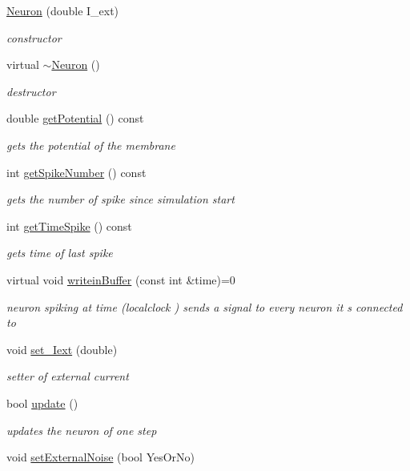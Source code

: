 \begin{DoxyCompactItemize}
\item 
\hyperlink{classNeuron_ab5d525bfb8a3ad0442c3e2980b5a144a}{Neuron} (double I\-\_\-ext)
\begin{DoxyCompactList}\small\item\em constructor \end{DoxyCompactList}\item 
\hypertarget{classNeuron_a94a250ce7e167760e593979b899745b1}{virtual \hyperlink{classNeuron_a94a250ce7e167760e593979b899745b1}{$\sim$\-Neuron} ()}\label{classNeuron_a94a250ce7e167760e593979b899745b1}

\begin{DoxyCompactList}\small\item\em destructor \end{DoxyCompactList}\item 
double \hyperlink{classNeuron_ae2bc004a58621da0d1c51591400ca87d}{get\-Potential} () const 
\begin{DoxyCompactList}\small\item\em gets the potential of the membrane \end{DoxyCompactList}\item 
int \hyperlink{classNeuron_af4482bf7c03f6ac6d6a510fd9c022073}{get\-Spike\-Number} () const 
\begin{DoxyCompactList}\small\item\em gets the number of spike since simulation start \end{DoxyCompactList}\item 
int \hyperlink{classNeuron_ac800b0047abe17000848648ed81e1017}{get\-Time\-Spike} () const 
\begin{DoxyCompactList}\small\item\em gets time of last spike \end{DoxyCompactList}\item 
\hypertarget{classNeuron_a41c979859ae91f8f80d58b2d01e1421e}{virtual void \hyperlink{classNeuron_a41c979859ae91f8f80d58b2d01e1421e}{writein\-Buffer} (const int \&time)=0}\label{classNeuron_a41c979859ae91f8f80d58b2d01e1421e}

\begin{DoxyCompactList}\small\item\em neuron spiking at time (localclock ) sends a signal to every neuron it s connected to \end{DoxyCompactList}\item 
void \hyperlink{classNeuron_a7cfb9edb8de019bcaaea6cdf9c8e3b93}{set\-\_\-\-Iext} (double)
\begin{DoxyCompactList}\small\item\em setter of external current \end{DoxyCompactList}\item 
bool \hyperlink{classNeuron_ade349102c17d508352a1061798083ba2}{update} ()
\begin{DoxyCompactList}\small\item\em updates the neuron of one step \end{DoxyCompactList}\item 
void \hyperlink{classNeuron_a443fcbb53284a313600338fc3baba218}{set\-External\-Noise} (bool Yes\-Or\-No)
\end{DoxyCompactItemize}
